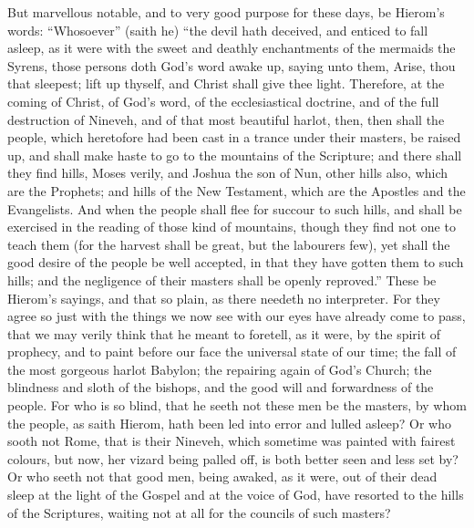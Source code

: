 But
marvellous notable, and to very good purpose for these days, be Hierom’s
words: “Whosoever” (saith he) “the devil hath deceived,
and enticed to fall asleep, as it were with the sweet and deathly enchantments
of the mermaids the Syrens, those persons doth God’s word awake
up, saying unto them, Arise, thou that sleepest; lift up thyself, and
Christ shall give thee light. Therefore, at the coming of Christ,
of God’s word, of the ecclesiastical doctrine, and of the full
destruction of Nineveh, and of that most beautiful harlot, then, then
shall the people, which heretofore had been cast in a trance under their
masters, be raised up, and shall make haste to go to the mountains of
the Scripture; and there shall they find hills, Moses verily, and Joshua
the son of Nun, other hills also, which are the Prophets; and hills
of the New Testament, which are the Apostles and the Evangelists.
And when the people shall flee for succour to such hills, and shall
be exercised in the reading of those kind of mountains, though they
find not one to teach them (for the harvest shall be great, but the
labourers few), yet shall the good desire of the people be well accepted,
in that they have gotten them to such hills; and the negligence of their
masters shall be openly reproved.” These be Hierom’s
sayings, and that so plain, as there needeth no interpreter. For
they agree so just with the things we now see with our eyes have already
come to pass, that we may verily think that he meant to foretell, as
it were, by the spirit of prophecy, and to paint before our face the
universal state of our time; the fall of the most gorgeous harlot Babylon;
the repairing again of God’s Church; the blindness and sloth of
the bishops, and the good will and forwardness of the people.
For who is so blind, that he seeth not these men be the masters, by
whom the people, as saith Hierom, hath been led into error and lulled
asleep? Or who sooth not Rome, that is their Nineveh, which sometime
was painted with fairest colours, but now, her vizard being palled off,
is both better seen and less set by? Or who seeth not that good
men, being awaked, as it were, out of their dead sleep at the light
of the Gospel and at the voice of God, have resorted to the hills of
the Scriptures, waiting not at all for the councils of such masters?

